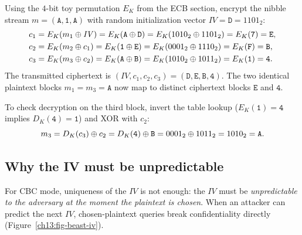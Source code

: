 Using the $4$-bit toy permutation $E_K$ from the ECB section, encrypt the nibble stream $m = (\mathtt{A}, \mathtt{1}, \mathtt{A})$ with random initialization vector $\mathit{IV} = \mathtt{D} = 1101_2$:
\begin{align*}
c_1 &= E_K(m_1 \oplus \mathit{IV}) = E_K(\mathtt{A} \oplus \mathtt{D}) = E_K(1010_2 \oplus 1101_2) = E_K(\mathtt{7}) = \mathtt{E},\\
c_2 &= E_K(m_2 \oplus c_1) = E_K(\mathtt{1} \oplus \mathtt{E}) = E_K(0001_2 \oplus 1110_2) = E_K(\mathtt{F}) = \mathtt{B},\\
c_3 &= E_K(m_3 \oplus c_2) = E_K(\mathtt{A} \oplus \mathtt{B}) = E_K(1010_2 \oplus 1011_2) = E_K(\mathtt{1}) = \mathtt{4}.
\end{align*}
The transmitted ciphertext is $(\mathit{IV}, c_1, c_2, c_3) = (\mathtt{D}, \mathtt{E}, \mathtt{B}, \mathtt{4})$. The two identical plaintext blocks $m_1 = m_3 = \mathtt{A}$ now map to distinct ciphertext blocks $\mathtt{E}$ and $\mathtt{4}$.

To check decryption on the third block, invert the table lookup ($E_K(\mathtt{1}) = \mathtt{4}$ implies $D_K(\mathtt{4}) = \mathtt{1}$) and XOR with $c_2$:
\[
m_3 = D_K(c_3) \oplus c_2 = D_K(\mathtt{4}) \oplus \mathtt{B} = 0001_2 \oplus 1011_2 = 1010_2 = \mathtt{A}.
\]

\subsection{Why the IV must be unpredictable}

For CBC mode, uniqueness of the $\mathit{IV}$ is not enough: the $\mathit{IV}$ must be \emph{unpredictable to the adversary at the moment the plaintext is chosen}. When an attacker can predict the next $\mathit{IV}$, chosen-plaintext queries break confidentiality directly (Figure~\ref{ch13:fig-beast-iv}).

